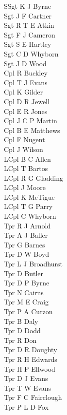 \begin{multicols}{2}
  \noindent
  SSgt K J Byrne \\
  Sgt J F Cartner \\
  Sgt R T E Atkin \\
  Sgt F J Cameron \\
  Sgt S E Hartley \\
  Sgt C D Whyborn \\
  Sgt J D Wood \\
  Cpl R Buckley \\
  Cpl T J Evans \\
  Cpl K Gilder \\
  Cpl D R Jewell \\
  Cpl E R Jones \\
  Cpl J C P Martin \\
  Cpl B E Matthews \\
  Cpl F Nugent \\
  Cpl J Wilson \\
  LCpl B C Allen \\
  LCpl T Bartos \\
  LCpl R G Gladding \\
  LCpl J Moore \\
  LCpl K McTigue \\
  LCpl T G Parry \\
  LCpl C Whyborn \\
  Tpr R J Arnold \\
  Tpr A J Baller \\
  Tpr G Barnes \\
  Tpr D W Boyd \\
  Tpr L J Broadhurst \\
  Tpr D Butler \\
  Tpr D P Byrne \\
  Tpr N Cairns \\
  Tpr M E Craig \\
  Tpr P A Curzon \\
  Tpr B Daly \\
  Tpr D Dodd \\
  Tpr R Don \\
  Tpr D R Doughty \\
  Tpr R H Edwards \\
  Tpr H P Ellwood \\
  Tpr D J Evans \\
  Tpr T W Evans \\
  Tpr F C Fairclough \\
  Tpr P L D Fox \\

\end{multicols}
